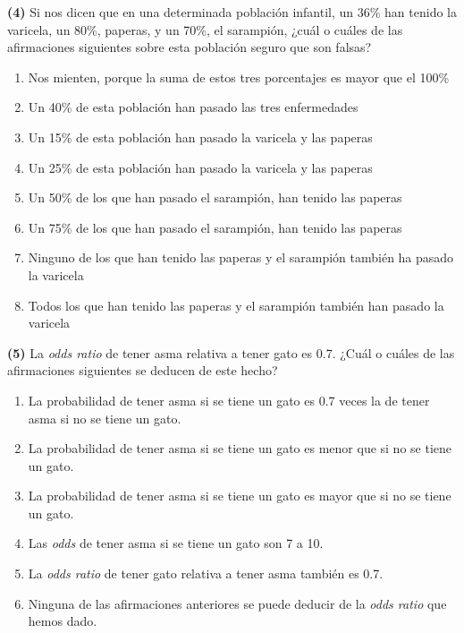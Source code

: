 \documentclass[
]{book}
\providecommand{\tightlist}{%
  \setlength{\itemsep}{0pt}\setlength{\parskip}{0pt}}
\theoremstyle{definition}
\theoremstyle{definition}
\theoremstyle{definition}
\theoremstyle{definition}
\theoremstyle{remark}
\begin{document}
\textbf{(4)} Si nos dicen que en una determinada población infantil, un 36\% han tenido la varicela, un 80\%, paperas, y un 70\%, el sarampión, ¿cuál o cuáles de las afirmaciones siguientes sobre esta población seguro que son falsas?

\begin{enumerate}
\def\labelenumi{\arabic{enumi}.}
\tightlist
\item
  Nos mienten, porque la suma de estos tres porcentajes es mayor que el 100\%
\item
  Un 40\% de esta población han pasado las tres enfermedades
\item
  Un 15\% de esta población han pasado la varicela y las paperas
\item
  Un 25\% de esta población han pasado la varicela y las paperas
\item
  Un 50\% de los que han pasado el sarampión, han tenido las paperas
\item
  Un 75\% de los que han pasado el sarampión, han tenido las paperas
\item
  Ninguno de los que han tenido las paperas y el sarampión también ha pasado la varicela
\item
  Todos los que han tenido las paperas y el sarampión también han pasado la varicela
\end{enumerate}

\textbf{(5)} La \emph{odds ratio} de tener asma relativa a tener gato es 0.7. ¿Cuál o cuáles de las afirmaciones siguientes se deducen de este hecho?

\begin{enumerate}
\def\labelenumi{\arabic{enumi}.}
\tightlist
\item
  La probabilidad de tener asma si se tiene un gato es 0.7 veces la de tener asma si no se tiene un gato.
\item
  La probabilidad de tener asma si se tiene un gato es menor que si no se tiene un gato.
\item
  La probabilidad de tener asma si se tiene un gato es mayor que si no se tiene un gato.
\item
  Las \emph{odds} de tener asma si se tiene un gato son 7 a 10.
\item
  La \emph{odds ratio} de tener gato relativa a tener asma también es 0.7.
\item
  Ninguna de las afirmaciones anteriores se puede deducir de la \emph{odds ratio} que hemos dado.
\end{enumerate}
\end{document}
